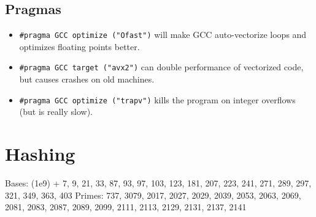 	\subsection{Pragmas}
		\begin{itemize}
			\item \lstinline{#pragma GCC optimize ("Ofast")} will make GCC auto-vectorize loops and optimizes floating points better.
			\item \lstinline{#pragma GCC target ("avx2")} can double performance of vectorized code, but causes crashes on old machines.
			\item \lstinline{#pragma GCC optimize ("trapv")} kills the program on integer overflows (but is really slow).
		\end{itemize}

\section{Hashing}
Bases: (1e9) + {7, 9, 21, 33, 87, 93, 97, 103, 123, 181, 207, 223, 241, 271, 289, 297, 321, 349, 363, 403}
Primes: 737, 3079, 2017, 2027, 2029, 2039, 2053, 2063, 2069, 2081, 2083, 2087, 2089, 2099, 2111, 2113, 2129, 2131, 2137, 2141